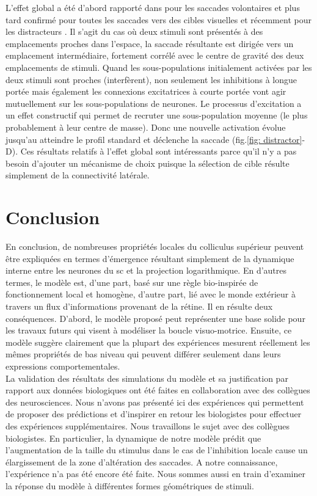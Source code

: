 L'effet global a été d'abord rapporté dans \cite{Coren:1972} pour les saccades volontaires et plus tard confirmé pour toutes les saccades vers des cibles visuelles \cite{Deubel:1984, Findlay:1982} et récemment pour les distracteurs \cite{VanderStigchel:2011}. Il s'agit du cas o\`u deux stimuli sont présentés à des emplacements proches dans l'espace, la saccade résultante est dirigée vers un emplacement intermédiaire, fortement corrélé avec le centre de gravité des deux emplacements de stimuli. Quand les sous-populations initialement activées par les deux stimuli sont proches (interfèrent), non seulement les inhibitions à longue portée mais également les connexions excitatrices à courte portée vont agir mutuellement sur les sous-populations de neurones. Le processus d'excitation a un effet constructif qui permet de recruter une sous-population moyenne (le plus probablement à leur centre de masse). Donc une nouvelle activation évolue jusqu'au atteindre le profil standard et déclenche la saccade (fig.\ref{fig: distractor}-D). Ces résultats relatifs à l'effet global sont intéressants parce qu'il n'y a pas besoin d'ajouter un mécanisme de choix puisque la sélection de cible résulte simplement de la connectivité latérale. 


\section{Conclusion}

En conclusion, de nombreuses propriétés locales du colliculus supérieur peuvent être expliquées en termes d'émergence résultant simplement de la dynamique interne entre les neurones du \gls{sc} et la projection logarithmique. En d'autres termes, le modèle est, d'une part, basé sur une règle bio-inspirée de fonctionnement local et homogène, d'autre part, lié avec le monde extérieur à travers un flux d'informations provenant de la rétine. Il en résulte deux conséquences. D'abord, le modèle proposé peut représenter une base solide pour les travaux futurs qui visent à modéliser la boucle visuo-motrice. Ensuite, ce modèle suggère clairement que la plupart des expériences mesurent réellement les mêmes propriétés de bas niveau qui peuvent différer seulement dans leurs expressions comportementales.\\

La validation des résultats des simulations du modèle et sa justification par rapport aux données biologiques ont été faites en collaboration avec des collègues des neurosciences. Nous n'avons pas présenté ici des expériences qui permettent de proposer des prédictions et d'inspirer en retour les biologistes pour effectuer des expériences supplémentaires. Nous travaillons le sujet avec des collègues biologistes. En particulier, la dynamique de notre modèle prédit que l'augmentation de la taille du stimulus dans le cas de l'inhibition locale cause un élargissement de la zone d'altération des saccades. A notre connaissance, l'expérience n'a pas été encore été faite. Nous sommes aussi en train d'examiner la réponse du modèle à différentes formes géométriques de stimuli.\\


